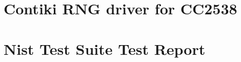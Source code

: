 \section{Contiki RNG driver for CC2538} \label{ContikiRngDriver}


\section{Nist Test Suite Test Report} \label{NistTestReport}
